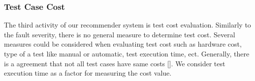 

\subsubsection{Test Case Cost}

The third activity of our recommender system is test cost 
evaluation. Similarly to the fault severity, there is no general measure 
to determine test cost. Several measures could be considered when evaluating
test cost such as hardware cost, type of a test like manual or automatic, 
test execution time, ect. Generally, there is a agreement that not all test cases have
same costs []. We consider test execution time as a factor for measuring the cost value. 
 





